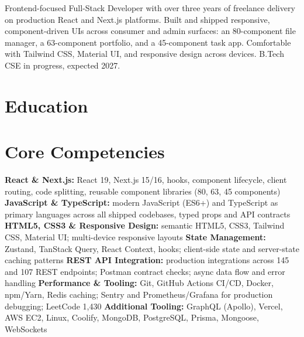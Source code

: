 \documentclass[11pt,a4paper,sans]{moderncv}
\begin{document}
\makecvtitle


\vspace{4pt}
\small{Frontend-focused Full-Stack Developer with over three years of freelance delivery on production React and Next.js platforms. Built and shipped responsive, component-driven UIs across consumer and admin surfaces: an 80-component file manager, a 63-component portfolio, and a 45-component task app. Comfortable with Tailwind CSS, Material UI, and responsive design across devices. B.Tech CSE in progress, expected 2027.}


\section{Education}
\vspace{1pt}


\section{Core Competencies}
\vspace{1pt}
\raggedright
\textbf{React \& Next.js:} React 19, Next.js 15/16, hooks, component lifecycle, client routing, code splitting, reusable component libraries (80, 63, 45 components) \textbar{}
\textbf{JavaScript \& TypeScript:} modern JavaScript (ES6+) and TypeScript as primary languages across all shipped codebases, typed props and API contracts \textbar{}
\textbf{HTML5, CSS3 \& Responsive Design:} semantic HTML5, CSS3, Tailwind CSS, Material UI; multi-device responsive layouts \textbar{}
\textbf{State Management:} Zustand, TanStack Query, React Context, hooks; client-side state and server-state caching patterns \textbar{}
\textbf{REST API Integration:} production integrations across 145 and 107 REST endpoints; Postman contract checks; async data flow and error handling \textbar{}
\textbf{Performance \& Tooling:} Git, GitHub Actions CI/CD, Docker, npm/Yarn, Redis caching; Sentry and Prometheus/Grafana for production debugging; LeetCode 1,430 \textbar{}
\textbf{Additional Tooling:} GraphQL (Apollo), Vercel, AWS EC2, Linux, Coolify, MongoDB, PostgreSQL, Prisma, Mongoose, WebSockets
\par\normalfont
\end{document}
